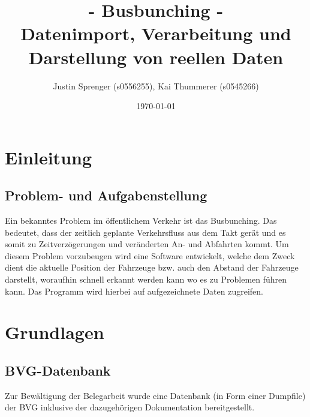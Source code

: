 \documentclass[a4paper, 12pt]{scrartcl}
\begin{document}
\begin{titlepage}
\author{Justin Sprenger (s0556255), 
Kai Thummerer (s0545266)} 
\title{- Busbunching -\\
Datenimport, Verarbeitung und Darstellung von reellen Daten} 
\date{\today} 
\maketitle
\end{titlepage}

\tableofcontents
\newpage
\section{Einleitung}
\subsection{Problem- und Aufgabenstellung}
Ein bekanntes Problem im öffentlichem Verkehr ist das Busbunching. Das bedeutet, dass der zeitlich geplante Verkehrsfluss aus dem Takt gerät und es somit zu Zeitverzögerungen und veränderten An- und Abfahrten kommt. Um diesem Problem vorzubeugen wird eine Software entwickelt, welche dem Zweck dient die aktuelle Position der Fahrzeuge bzw. auch den Abstand der Fahrzeuge darstellt, woraufhin schnell erkannt werden kann wo es zu Problemen führen kann.
Das Programm wird hierbei auf aufgezeichnete Daten zugreifen.

\section{Grundlagen}
\subsection{BVG-Datenbank}
Zur Bewältigung der Belegarbeit wurde eine Datenbank (in Form einer Dumpfile) der BVG inklusive der dazugehörigen Dokumentation bereitgestellt.
\end{document}
